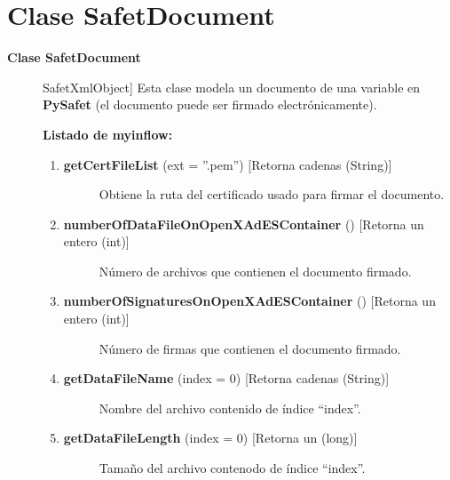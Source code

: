 \documentclass[letterpaper,11pt,spanish]{sphinxmanual}
\begin{document}
\chapter{Clase SafetDocument}
\label{_templates/Contenido5/Clase3:clase-safetdocument}\label{_templates/Contenido5/Clase3::doc}\begin{description}
\item[{\textbf{Clase SafetDocument}}] \leavevmode{[}SafetXmlObject{]}
Esta clase modela un documento de una variable en \textbf{PySafet} (el documento puede ser firmado electrónicamente).

\textbf{Listado de myinflow:}
\begin{enumerate}
\item {} \begin{description}
\item[{\textbf{getCertFileList} (ext = ''.pem'') {[}Retorna cadenas (String){]}}] \leavevmode
Obtiene la ruta del certificado usado para firmar el documento.

\end{description}

\item {} \begin{description}
\item[{\textbf{numberOfDataFileOnOpenXAdESContainer} () {[}Retorna un entero (int){]}}] \leavevmode
Número de archivos que contienen el documento firmado.

\end{description}

\item {} \begin{description}
\item[{\textbf{numberOfSignaturesOnOpenXAdESContainer} () {[}Retorna un entero (int){]}}] \leavevmode
Número de firmas que contienen el documento firmado.

\end{description}

\item {} \begin{description}
\item[{\textbf{getDataFileName} (index = 0) {[}Retorna cadenas (String){]}}] \leavevmode
Nombre del archivo contenido de índice ``index''.

\end{description}

\item {} \begin{description}
\item[{\textbf{getDataFileLength} (index = 0) {[}Retorna un (long){]}}] \leavevmode
Tamaño del archivo contenodo de índice ``index''.


\end{description}
\end{enumerate}
\end{description}
\end{document}
